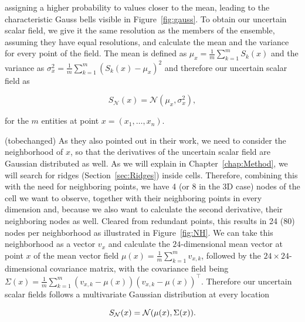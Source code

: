 assigning a higher probability to values closer to the mean, leading to
the characteristic Gauss bells visible in Figure~\ref{fig:gauss}. To
obtain our uncertain scalar field, we give it the same resolution as the
members of the ensemble, assuming they have equal resolutions, and
calculate the mean and the variance for every point of the field. The
mean is defined as $\mu_x = \frac{1}{m} \sum_{k=1}^m S_k(x)$ and the
variance as $\sigma_x^2 = \frac{1}{m} \sum_{k=1}^m (S_k(x)-\mu_x)^2$ and
therefore our uncertain scalar field as

\begin{equation}
  S_{\mathcal{N}}(x) = \mathcal{N}(\mu_{x}, \sigma_{x}^2),
\end{equation}

\noindent for the $m$ entities at point $x = (x_1,\dots,x_n)$.

(tobechanged)
As they also pointed out in their work, we need to consider the
neighborhood of $x$, so that the derivatives of the uncertain scalar
field are Gaussian distributed as well. As we will explain in
Chapter~\ref{chap:Method}, we will search for ridges
(Section~\ref{sec:Ridges}) inside cells. Therefore, combining this with
the need for neighboring points, we have 4 (or 8 in the 3D case) nodes
of the cell we want to observe, together with their neighboring points
in every dimension and, because we also want to calculate the second
derivative, their neighboring nodes as well. Cleared from redundant
points, this results in 24 (80) nodes per neighborhood as illustrated in
Figure~\ref{fig:NH}. We can take this neighborhood as a vector $v_x$ and
calculate the $24$-dimensional mean vector at point $x$ of the mean
vector field $\mu(x) = \frac{1}{m} \sum_{k=1}^m v_{x,k}$, followed by
the $24 \times 24$-dimensional covariance matrix, with the covariance
field being $\Sigma(x)= \frac{1}{m} \sum_{k=1}^m (v_{x,k} -
\mu(x)){(v_{x,k} - \mu{(x)})}^\top$. Therefore our uncertain scalar
fields follows a multivariate Gaussian distribution at every location

\begin{equation}
  S_{\mathcal{N}}(x) = \mathcal{N}(\mu(x), \Sigma(x)).\\
\end{equation}

